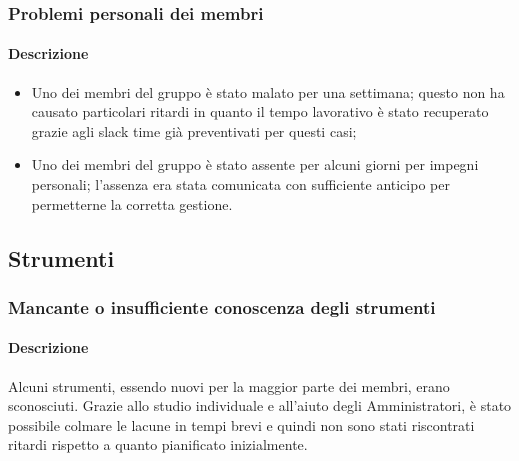 \subsubsection{Problemi personali dei membri}
\paragraph {Descrizione}
\begin{itemize}
	\item Uno dei membri del gruppo è stato malato per una settimana; questo non ha causato particolari ritardi in quanto il tempo lavorativo è stato recuperato grazie agli slack time già preventivati per questi casi;
	\item Uno dei membri del gruppo è stato assente per alcuni giorni per impegni personali; l'assenza era stata comunicata con sufficiente anticipo per permetterne la corretta gestione.
\end{itemize}

\subsection{Strumenti}
\subsubsection{Mancante o insufficiente conoscenza degli strumenti}
\paragraph {Descrizione}
Alcuni strumenti, essendo nuovi per la maggior parte dei membri, erano sconosciuti. Grazie allo studio individuale e all'aiuto degli Amministratori, è stato possibile colmare le lacune in tempi brevi e quindi non sono stati riscontrati ritardi rispetto a quanto pianificato inizialmente.